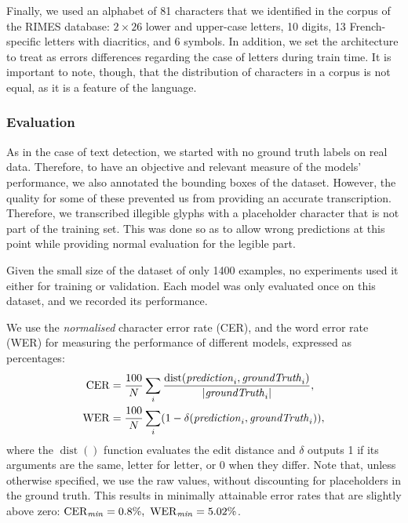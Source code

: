 		Finally, we used an alphabet of 81 characters that we identified in the corpus of the RIMES database: \(2 \times 26\) lower and upper-case letters, 10 digits, 13 French-specific letters with diacritics, and 6 symbols. In addition, we set the architecture to treat as errors differences regarding the case of letters during train time. It is important to note, though, that the distribution of characters in a corpus is not equal, as it is a feature of the language.

		\subsubsection*{Evaluation}
			As in the case of text detection, we started with no ground truth labels on real data. Therefore, to have an objective and relevant measure of the models' performance, we also annotated the bounding boxes of the  dataset. However, the quality for some of these prevented us from providing an accurate transcription. Therefore, we transcribed illegible glyphs with a placeholder character that is not part of the training set. This was done so as to allow wrong predictions at this point while providing normal evaluation for the legible part.

			Given the small size of the  dataset of only 1400 examples, no experiments used it either for training or validation. Each model was only evaluated once on this dataset, and we recorded its performance.

			We use the \emph{normalised} character error rate (CER), and the word error rate (WER) for measuring the performance of different models, expressed as percentages: \[
			\begin{aligned}
				\operatorname{CER} &= \frac{100}{N} \sum_i \frac{\operatorname{dist}(\mathit{prediction}_i, \mathit{groundTruth}_i)}{\left\vert\mathit{groundTruth}_i\right\vert},\\
				\operatorname{WER} &= \frac{100}{N} \sum_i (1 - \delta (\mathit{prediction}_i, \mathit{groundTruth}_i)),
			\end{aligned}
			\]
			where the \(\operatorname{dist}()\) function evaluates the edit distance and \(\delta\) outputs 1 if its arguments are the same, letter for letter, or 0 when they differ. Note that, unless otherwise specified, we use the raw values, without discounting for placeholders in the ground truth. This results in minimally attainable error rates that are slightly above zero: \(\operatorname{CER}_\mathit{min} = 0.8\%,~\operatorname{WER}_\mathit{min} = 5.02\%\).

